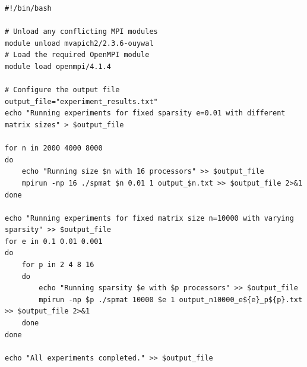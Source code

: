 \documentclass{article}
\begin{document}
\begin{verbatim}
#!/bin/bash

# Unload any conflicting MPI modules
module unload mvapich2/2.3.6-ouywal
# Load the required OpenMPI module
module load openmpi/4.1.4

# Configure the output file
output_file="experiment_results.txt"
echo "Running experiments for fixed sparsity e=0.01 with different matrix sizes" > $output_file

for n in 2000 4000 8000
do
    echo "Running size $n with 16 processors" >> $output_file
    mpirun -np 16 ./spmat $n 0.01 1 output_$n.txt >> $output_file 2>&1
done

echo "Running experiments for fixed matrix size n=10000 with varying sparsity" >> $output_file
for e in 0.1 0.01 0.001
do
    for p in 2 4 8 16
    do
        echo "Running sparsity $e with $p processors" >> $output_file
        mpirun -np $p ./spmat 10000 $e 1 output_n10000_e${e}_p${p}.txt >> $output_file 2>&1
    done
done

echo "All experiments completed." >> $output_file

\end{verbatim}
\end{document}
